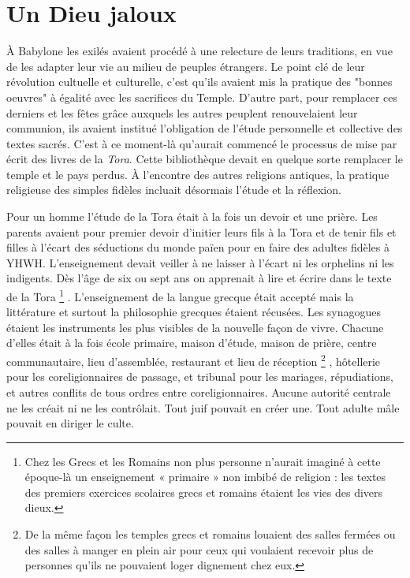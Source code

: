\section{Un Dieu jaloux}

 À Babylone les exilés avaient procédé à une relecture de leurs traditions, en vue de les adapter leur vie au milieu de peuples étrangers. Le point clé de leur révolution cultuelle et culturelle, c'est qu'ils avaient mis la pratique des "bonnes oeuvres" à égalité avec les sacrifices du Temple. D'autre part, pour remplacer ces derniers et les fêtes grâce auxquels les autres peuplent renouvelaient leur communion, ils avaient institué l'obligation de l'étude personnelle et collective des textes sacrés. C'est à ce moment-là qu'aurait commencé le processus de mise par écrit des livres de la \emph{Tora}. Cette bibliothèque devait en quelque sorte remplacer le temple et le pays perdus. À l'encontre des autres religions antiques, la pratique religieuse des simples fidèles incluait désormais l'étude et la réflexion. 

 Pour un homme l'étude de la Tora était à la fois un devoir et une prière. Les parents avaient pour premier devoir d'initier leurs fils à la Tora et de tenir fils et filles à l'écart des séductions du monde païen pour en faire des adultes fidèles à YHWH. L'enseignement devait veiller à ne laisser à l'écart ni les orphelins ni les indigents. Dès l'âge de six ou sept ans on apprenait à lire et écrire dans le texte de la Tora%
\footnote{Chez les Grecs et les Romains non plus personne n'aurait imaginé à cette époque-là un enseignement « primaire » non imbibé de religion : les textes des premiers exercices scolaires grecs et romains étaient les vies des divers dieux.}%
. L'enseignement de la langue grecque était accepté mais la littérature et surtout la philosophie grecques étaient récusées. 
Les synagogues étaient les instruments les plus visibles de la nouvelle façon de vivre. Chacune d'elles était à la fois école primaire, maison d'étude, maison de prière, centre communautaire, lieu d'assemblée, restaurant et lieu de réception%
\footnote{De la même façon les temples grecs et romains louaient des salles fermées ou des salles à manger en plein air pour ceux qui voulaient recevoir plus de personnes qu'ils ne pouvaient loger dignement chez eux.}%
, hôtellerie pour les coreligionnaires de passage, et tribunal pour les mariages, répudiations, et autres conflits de tous ordres entre coreligionnaires. Aucune autorité centrale ne les créait ni ne les contrôlait. Tout juif pouvait en créer une. Tout adulte mâle pouvait en diriger le culte.



